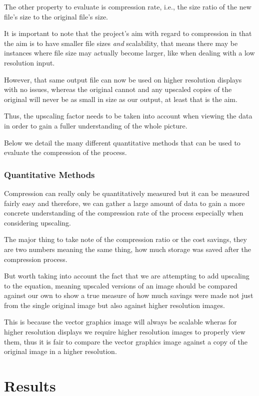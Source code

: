 \documentclass[12pt]{article}
\newcommand{\sentence}{} %
\newcommand{\italic}[1]{\textit{#1}}
\begin{document}
    \tab
    The other property to evaluate is compression rate, i.e., the size ratio of the new file's size to the original
    file's size.
    \sentence
    It is important to note that the project's aim with regard to compression in that the aim is to have smaller file
    sizes \italic{and} scalability, that means there may be instances where file size may actually become larger,
    like when dealing with a low resolution input.
    \sentence
    However, that same output file can now be used on higher resolution displays with no issues, whereas the original
    cannot and any upscaled copies of the original will never be as small in size as our output, at least that is the
    aim.
    \sentence
    Thus, the upscaling factor needs to be taken into account when viewing the data in order to gain a fuller
    understanding of the whole picture.
    \sentence
    Below we detail the many different quantitative methods that can be used to evaluate the compression of the process.

    \subsubsection{Quantitative Methods}\label{subsubsec:quantitative-methods2}

    \tab
    Compression can really only be quantitatively measured but it can be measured fairly easy and therefore, we can
    gather a large amount of data to gain a more concrete understanding of the compression rate of the
    process especially when considering upscaling.
    \sentence
    The major thing to take note of the compression ratio or the cost savings, they are two numbers meaning the same
    thing, how much storage was saved after the compression process.
    \sentence
    But worth taking into account the fact that we are attempting to add upscaling to the equation, meaning upscaled
    versions of an image should be compared against our own to show a true measure of how much savings were made not
    just from the single original image but also against higher resolution images.
    \sentence
    This is because the vector graphics image will always be scalable wheras for higher resolution displays we
    require higher resolution images to properly view them, thus it is fair to compare the vector graphics image
    against a copy of the original image in a higher resolution.

    \pagebreak


    \section{Results}\label{sec:results}
\end{document}
